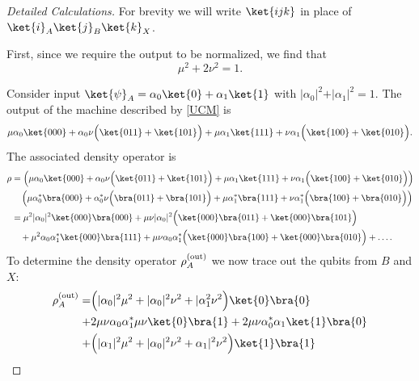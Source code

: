 \documentclass[reqno]{amsart}
\numberwithin{lemma}{section}
\numberwithin{proposition}{section}
\begin{document}
\begin{proof}[Detailed Calculations]
	For brevity we will write $\ket{ijk}$ in place of $\ket{i}_{A} \ket{j}_{B} \ket{k}_{X}$.
	
	First, since we require the output to be normalized, we find that
	\begin{equation*}
		\mu^{2} + 2 \nu^{2} = 1.
	\end{equation*}
	
	Consider input $\ket{\psi}_{A} = \alpha_{0} \ket{0} + \alpha_{1} \ket{1}$ with $\vert \alpha_{0} \vert^{2} + \vert \alpha_{1} \vert^{2} = 1$. The output of the machine described by \eqref{UCM} is
	\begin{align*}
		\mu \alpha_{0} \ket{000} + \alpha_{0} \nu \Big (\ket{011} + \ket{101} \Big ) + \mu \alpha_{1} \ket{111} + \nu \alpha_{1} \Big ( \ket{100} + \ket{010} \Big ).
	\end{align*}
	The associated density operator is
	\begin{align*}
		\rho &= \left ( \mu \alpha_{0} \ket{000} + \alpha_{0} \nu \Big (\ket{011} + \ket{101} \Big ) + \mu \alpha_{1} \ket{111} + \nu \alpha_{1} \Big ( \ket{100} + \ket{010} \Big )\right )\\
		& \quad \left ( \mu \alpha_{0}^{*} \bra{000} + \alpha_{0}^{*} \nu \Big (\bra{011} + \bra{101} \Big ) + \mu \alpha_{1}^{*} \bra{111} + \nu \alpha_{1}^{*} \Big ( \bra{100} + \bra{010} \Big )\right )\\
		&= \mu^{2} \vert \alpha_{0} \vert^{2} \ket{000} \bra{000} + \mu \nu \vert \alpha_{0} \vert^{2} \Big ( \ket{000} \bra{011} + \ket{000} \bra{101} \Big )\\
		&\quad + \mu^{2} \alpha_{0} \alpha_{1}^{*} \ket{000} \bra{111} + \mu \nu \alpha_{0} \alpha_{1}^{*} \Big ( \ket{000} \bra{100} + \ket{000} \bra{010} \Big ) + \ldots.
	\end{align*}
	To determine the density operator $\rho_{A}^{\textnormal{(out)}}$ we now trace out the qubits from $B$ and $X$:
	\begin{align*}
		\rho_{A}^{\textnormal{(out)}} = &\Big ( \vert \alpha_{0} \vert^{2}\mu^{2} + \vert \alpha_{0} \vert^{2} \nu^{2} + \vert \alpha_{1}^{2} \nu^{2} \Big ) \ket{0} \bra{0}\\
		+ &2 \mu \nu \alpha_{0} \alpha_{1}^{*} \mu \nu \ket{0} \bra{1}
		+ 2 \mu \nu \alpha_{0}^{*} \alpha_{1} \ket{1} \bra{0}\\
		+ &\Big ( \vert \alpha_{1} \vert^{2} \mu^{2} + \vert \alpha_{0} \vert^{2} \nu^{2} + \alpha_{1} \vert^{2} \nu^{2} \Big ) \ket{1} \bra{1}
	\end{align*}

\end{proof}
\end{document}
